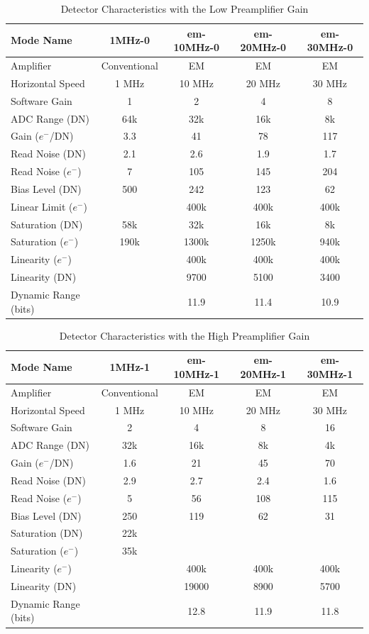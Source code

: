 \begin{table}
    \centering
    \begin{tabular}{lcccc}
    \hline
    Mode Name&1MHz-0&em-10MHz-0&em-20MHz-0&em-30MHz-0\\
    \hline
    Amplifier&Conventional&EM&EM&EM\\
    Horizontal Speed&1 MHz&10 MHz&20 MHz&30 MHz\\
    Software Gain&1&2&4&8\\
    ADC Range (DN)&64k&32k&16k&8k\\
    Gain ($e^-$/DN)&3.3&41&78&117\\
    Read Noise (DN)&2.1&2.6&1.9&1.7\\
    Read Noise ($e^-$)&7&105&145&204\\
    Bias Level (DN)&500&242&123&62\\
    Linear Limit ($e^-$)&&400k&400k&400k\\
    Saturation (DN)&58k&32k&16k&8k\\
    Saturation ($e^-$)&190k&1300k&1250k&940k\\
    Linearity ($e^-$)&&400k&400k&400k\\
    Linearity (DN)&&9700&5100&3400\\
    Dynamic Range (bits)&&11.9&11.4&10.9\\
    \hline
    \end{tabular}
    \caption{Detector Characteristics with the Low Preamplifier Gain}
    \label{table:detector-characteristics-low-gain}
\end{table}

\begin{table}
    \centering
    \begin{tabular}{lcccc}
    \hline
    Mode Name&1MHz-1&em-10MHz-1&em-20MHz-1&em-30MHz-1\\
    \hline
    Amplifier&Conventional&EM&EM&EM\\
    Horizontal Speed&1 MHz&10 MHz&20 MHz&30 MHz\\
    Software Gain&2&4&8&16\\
    ADC Range (DN)&32k&16k&8k&4k\\
    Gain ($e^-$/DN)&1.6&21&45&70\phantom{0}\\
    Read Noise (DN)&2.9&2.7&2.4&1.6\\
    Read Noise ($e^-$)&5&56&108&115\\
    Bias Level (DN)&250&119&62&31\\
    Saturation (DN)&22k&\\
    Saturation ($e^-$)&35k&\\
    Linearity ($e^-$)&&400k&400k&400k\\
    Linearity (DN)&&19000&8900&5700\\
    Dynamic Range (bits)&&12.8&11.9&11.8\\
    \hline
    \end{tabular}
    \caption{Detector Characteristics with the High Preamplifier Gain}
    \label{table:detector-characteristics-high-gain}
\end{table}

